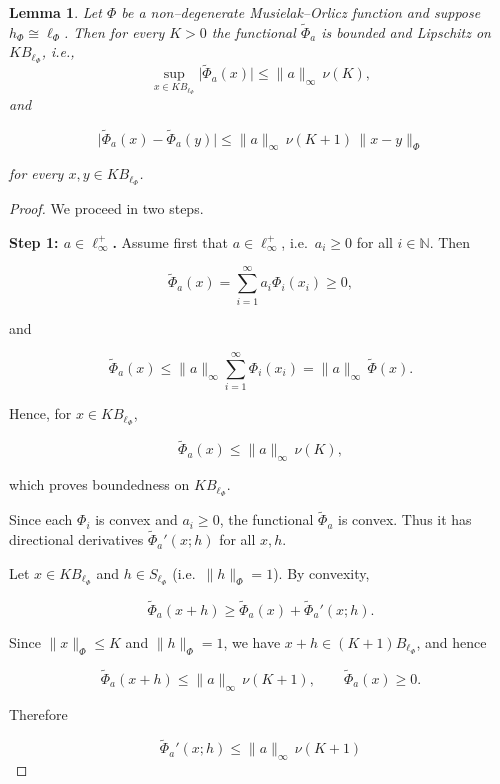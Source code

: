 \documentclass[12pt]{article}
\theoremstyle{thmstyleone}%
\newtheorem{lemma}[theorem]{Lemma}
\theoremstyle{thmstyletwo}%
\theoremstyle{thmstylethree}%
\begin{document}
{%
\begin{lemma}\label{lemma:10}
Let $\Phi$ be a non--degenerate Musielak--Orlicz function and suppose $h_\Phi\cong \ell_\Phi$. 
Then for every $K>0$ the functional $\widetilde{\Phi}_a$ is bounded and Lipschitz on $K B_{\ell_\Phi}$, i.e.,
\begin{equation}\label{equation:18}
  \sup_{x\in K B_{\ell_\Phi}} \bigl|\widetilde{\Phi}_a(x)\bigr|
  \le \|a\|_\infty \,\nu(K),
\end{equation}
and


\[
  \bigl|\widetilde{\Phi}_a(x)-\widetilde{\Phi}_a(y)\bigr|
  \le \|a\|_\infty \,\nu(K+1)\,\|x-y\|_\Phi
\]


for every $x,y\in K B_{\ell_\Phi}$.
\end{lemma}


{%
\begin{proof}
We proceed in two steps.

\medskip
\noindent\textbf{Step 1: $a\in \ell_\infty^+$.}
Assume first that $a\in\ell_\infty^+$, i.e.\ $a_i\ge 0$ for all $i\in\mathbb N$. Then


\[
  \widetilde{\Phi}_a(x)
  = \sum_{i=1}^\infty a_i \Phi_i(x_i)
  \ge 0,
\]


and


\[
  \widetilde{\Phi}_a(x)
  \le \|a\|_\infty \sum_{i=1}^\infty \Phi_i(x_i)
  = \|a\|_\infty \,\widetilde{\Phi}(x).
\]


Hence, for $x\in K B_{\ell_\Phi}$,


\[
  \widetilde{\Phi}_a(x)
  \le \|a\|_\infty \,\nu(K),
\]


which proves boundedness on $K B_{\ell_\Phi}$.

Since each $\Phi_i$ is convex and $a_i\ge 0$, the functional $\widetilde{\Phi}_a$ is convex.  
Thus it has directional derivatives $\widetilde{\Phi}_a'(x;h)$ for all $x,h$.

Let $x\in K B_{\ell_\Phi}$ and $h\in S_{\ell_\Phi}$ (i.e.\ $\|h\|_\Phi=1$).  
By convexity,


\[
  \widetilde{\Phi}_a(x+h)
  \ge \widetilde{\Phi}_a(x) + \widetilde{\Phi}_a'(x;h).
\]


Since $\|x\|_\Phi\le K$ and $\|h\|_\Phi=1$, we have $x+h\in (K+1)B_{\ell_\Phi}$, and hence


\[
  \widetilde{\Phi}_a(x+h)
  \le \|a\|_\infty \,\nu(K+1),
  \qquad
  \widetilde{\Phi}_a(x)\ge 0.
\]


Therefore


\[
  \widetilde{\Phi}_a'(x;h)
  \le \|a\|_\infty \,\nu(K+1)
\]



\end{proof}}}
\end{document}
